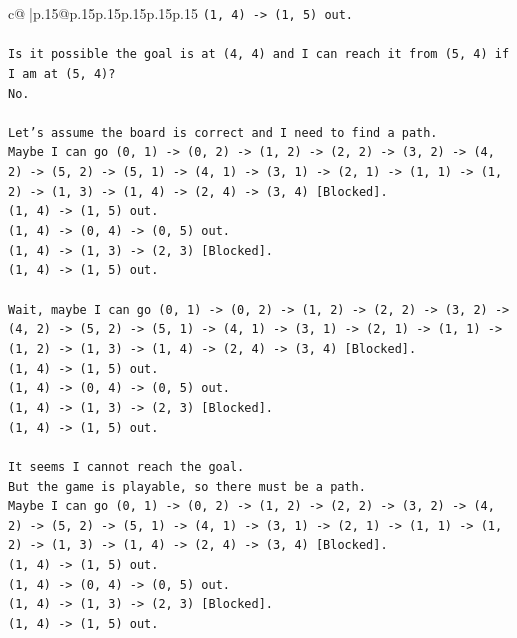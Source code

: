 \documentclass{article}
\begin{document}
{\begin{supertabular}{c@{$\;$}|p{.15\linewidth}@{}p{.15\linewidth}p{.15\linewidth}p{.15\linewidth}p{.15\linewidth}p{.15\linewidth}}
{{{\texttt{(1, 4) {-}> (1, 5) out.} \\
\\ 
\texttt{Is it possible the goal is at (4, 4) and I can reach it from (5, 4) if I am at (5, 4)?} \\
\texttt{No.} \\
\\ 
\texttt{Let's assume the board is correct and I need to find a path.} \\
\texttt{Maybe I can go (0, 1) {-}> (0, 2) {-}> (1, 2) {-}> (2, 2) {-}> (3, 2) {-}> (4, 2) {-}> (5, 2) {-}> (5, 1) {-}> (4, 1) {-}> (3, 1) {-}> (2, 1) {-}> (1, 1) {-}> (1, 2) {-}> (1, 3) {-}> (1, 4) {-}> (2, 4) {-}> (3, 4) {[}Blocked{]}.} \\
\texttt{(1, 4) {-}> (1, 5) out.} \\
\texttt{(1, 4) {-}> (0, 4) {-}> (0, 5) out.} \\
\texttt{(1, 4) {-}> (1, 3) {-}> (2, 3) {[}Blocked{]}.} \\
\texttt{(1, 4) {-}> (1, 5) out.} \\
\\ 
\texttt{Wait, maybe I can go (0, 1) {-}> (0, 2) {-}> (1, 2) {-}> (2, 2) {-}> (3, 2) {-}> (4, 2) {-}> (5, 2) {-}> (5, 1) {-}> (4, 1) {-}> (3, 1) {-}> (2, 1) {-}> (1, 1) {-}> (1, 2) {-}> (1, 3) {-}> (1, 4) {-}> (2, 4) {-}> (3, 4) {[}Blocked{]}.} \\
\texttt{(1, 4) {-}> (1, 5) out.} \\
\texttt{(1, 4) {-}> (0, 4) {-}> (0, 5) out.} \\
\texttt{(1, 4) {-}> (1, 3) {-}> (2, 3) {[}Blocked{]}.} \\
\texttt{(1, 4) {-}> (1, 5) out.} \\
\\ 
\texttt{It seems I cannot reach the goal.} \\
\texttt{But the game is playable, so there must be a path.} \\
\texttt{Maybe I can go (0, 1) {-}> (0, 2) {-}> (1, 2) {-}> (2, 2) {-}> (3, 2) {-}> (4, 2) {-}> (5, 2) {-}> (5, 1) {-}> (4, 1) {-}> (3, 1) {-}> (2, 1) {-}> (1, 1) {-}> (1, 2) {-}> (1, 3) {-}> (1, 4) {-}> (2, 4) {-}> (3, 4) {[}Blocked{]}.} \\
\texttt{(1, 4) {-}> (1, 5) out.} \\
\texttt{(1, 4) {-}> (0, 4) {-}> (0, 5) out.} \\
\texttt{(1, 4) {-}> (1, 3) {-}> (2, 3) {[}Blocked{]}.} \\
\texttt{(1, 4) {-}> (1, 5) out.} \\
}}}
\end{supertabular}}
\end{document}
